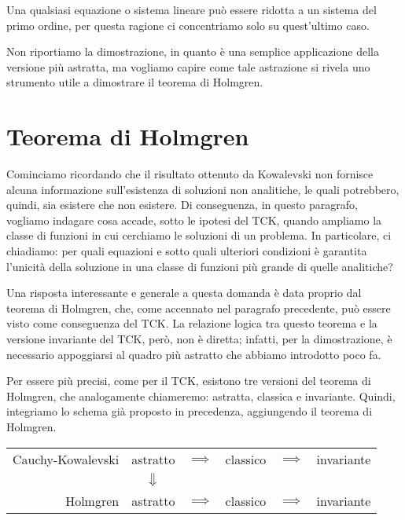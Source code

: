 \begin{remark}
Una qualsiasi equazione o sistema lineare può essere ridotta a un sistema del primo ordine, per questa ragione ci concentriamo solo su quest'ultimo caso.
\end{remark}

Non riportiamo la dimostrazione, in quanto è una semplice applicazione della versione più astratta, ma vogliamo capire come tale astrazione si rivela uno strumento utile a dimostrare il teorema di Holmgren.







\newpage
\section{Teorema di Holmgren}
Cominciamo ricordando che il risultato ottenuto da Kowalevski non fornisce alcuna informazione sull'esistenza di soluzioni non analitiche, le quali potrebbero, quindi, sia esistere che non esistere.
Di conseguenza, in questo paragrafo, vogliamo indagare cosa accade, sotto le ipotesi del TCK, quando ampliamo la classe di funzioni in cui cerchiamo le soluzioni di un problema. 
In particolare, ci chiadiamo: per quali equazioni e sotto quali ulteriori condizioni è garantita l'unicità della soluzione in una classe di funzioni più grande di quelle analitiche?

Una risposta interessante e generale a questa domanda è data proprio dal teorema di Holmgren, che, come accennato nel paragrafo precedente, può essere visto come conseguenza del TCK. 
La relazione logica tra questo teorema e la versione invariante del TCK, però, non è diretta; infatti, per la dimostrazione, è necessario appoggiarsi al quadro più astratto che abbiamo introdotto poco fa.

Per essere più precisi, come per il TCK, esistono tre versioni del teorema di Holmgren, che analogamente chiameremo: astratta, classica e invariante.
Quindi, integriamo lo schema già proposto in precedenza, aggiungendo il teorema di Holmgren.

\begin{center}
\renewcommand{\arraystretch}{1.5}
\begin{tabular}{r||ccccc} 
Cauchy-Kowalevski & astratto & $\implies$  & classico & $\implies$ & invariante\\
&$\big\Downarrow$ &&&&\\
Holmgren & astratto & $\implies$ & classico & $\implies$ & invariante\\
\end{tabular}
\end{center}

